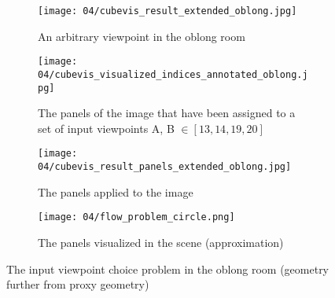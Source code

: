 \begin{figure}
\centering
    \hfill
    \begin{subfigure}[c]{0.45\textwidth}
            \centering
            \texttt{[image: 04/cubevis\_result\_extended\_oblong.jpg]}
            \caption{An arbitrary viewpoint in the oblong room}
    \end{subfigure}
    \hfill
    \begin{subfigure}[c]{0.45\textwidth}
            \centering
            \texttt{[image: 04/cubevis\_visualized\_indices\_annotated\_oblong.jpg]}
            \caption{The panels of the image that have been assigned to a set of input viewpoints A, B $\in [13, 14, 19, 20]$}
    \end{subfigure}
    \hfill

    \hfill
    \begin{subfigure}[c]{0.45\textwidth}
            \centering
            \texttt{[image: 04/cubevis\_result\_panels\_extended\_oblong.jpg]}
            \caption{The panels applied to the image}
    \end{subfigure}
    \hfill
    \begin{subfigure}[c]{0.45\textwidth}
            \centering
            \texttt{[image: 04/flow\_problem\_circle.png]}
            \caption{The panels visualized in the scene (approximation)}
    \end{subfigure}
    \hfill
  \caption{The input viewpoint choice problem in the oblong room (geometry further from proxy geometry)} \label{fig:flow_problem_oblong}
\end{figure}


